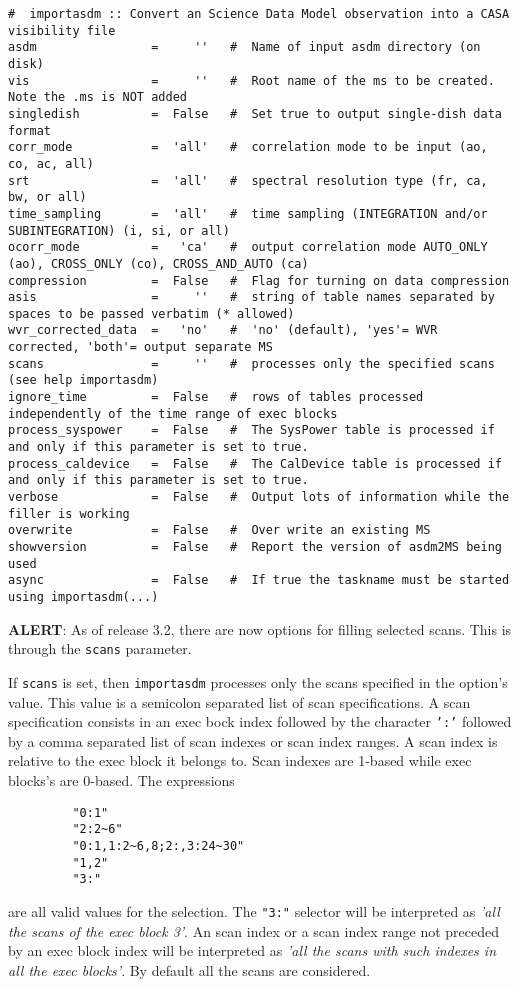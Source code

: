 \small
\begin{verbatim}
#  importasdm :: Convert an Science Data Model observation into a CASA visibility file
asdm                =     ''   #  Name of input asdm directory (on disk)
vis                 =     ''   #  Root name of the ms to be created. Note the .ms is NOT added
singledish          =  False   #  Set true to output single-dish data format
corr_mode           =  'all'   #  correlation mode to be input (ao, co, ac, all)
srt                 =  'all'   #  spectral resolution type (fr, ca, bw, or all)
time_sampling       =  'all'   #  time sampling (INTEGRATION and/or SUBINTEGRATION) (i, si, or all)
ocorr_mode          =   'ca'   #  output correlation mode AUTO_ONLY (ao), CROSS_ONLY (co), CROSS_AND_AUTO (ca)
compression         =  False   #  Flag for turning on data compression
asis                =     ''   #  string of table names separated by spaces to be passed verbatim (* allowed)
wvr_corrected_data  =   'no'   #  'no' (default), 'yes'= WVR corrected, 'both'= output separate MS
scans               =     ''   #  processes only the specified scans (see help importasdm)
ignore_time         =  False   #  rows of tables processed independently of the time range of exec blocks
process_syspower    =  False   #  The SysPower table is processed if and only if this parameter is set to true.
process_caldevice   =  False   #  The CalDevice table is processed if and only if this parameter is set to true.
verbose             =  False   #  Output lots of information while the filler is working
overwrite           =  False   #  Over write an existing MS
showversion         =  False   #  Report the version of asdm2MS being used
async               =  False   #  If true the taskname must be started using importasdm(...)
\end{verbatim}
\normalsize

{\bf ALERT}: As of release 3.2, there are now options for filling
selected scans. This is through the {\tt scans} parameter. 

If {\tt scans} is set, then {\tt importasdm} processes only the scans
specified in the option's value. This value is a semicolon separated
list of scan specifications. A scan specification consists in an exec
bock index followed by the character {\tt ':'} followed by a comma separated
list of scan indexes or scan index ranges. A scan index is relative to
the exec block it belongs to. Scan indexes are 1-based while exec
blocks's are 0-based. The expressions
\begin{verbatim}
         "0:1"
         "2:2~6"
         "0:1,1:2~6,8;2:,3:24~30"
         "1,2"
         "3:"
\end{verbatim}
are all valid values for the selection. The {\tt "3:"} selector will be interpreted
as {\it 'all the scans of the exec block 3'}. An scan index or a scan index
range not preceded by an exec block index will be interpreted as {\it 'all
the scans with such indexes in all the exec blocks'}.  By default all
the scans are considered.


